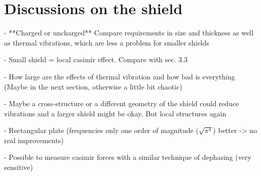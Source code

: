 \section{Discussions on the shield} \label{sec:5:discussion}

- **Charged or uncharged**
Compare requirements in size and thickness as well as thermal vibrations, which are less a problem for smaller shields

- Small shield = local casimir effect. Compare with sec. 3.3

- How large are the effects of thermal vibration and how bad is everything
(Maybe in the next section, otherwise a little bit chaotic)

- Maybe a cross-structure or a different geometry of the shield could reduce vibrations and a larger shield might be okay. But local structures again

- Rectangular plate (frequencies only one order of magnitude ($\sqrt{\pi^4}$) better -> no real improvements)

- Possible to measure casimir forces with a similar technique of dephasing (very sensitive)